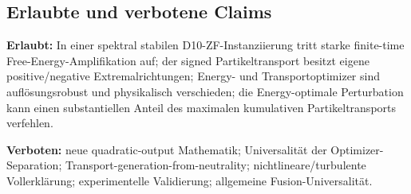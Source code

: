 \subsection{Erlaubte und verbotene Claims}
\textbf{Erlaubt:} In einer spektral stabilen D10-ZF-Instanziierung tritt starke finite-time Free-Energy-Amplifikation auf; der signed Partikeltransport besitzt eigene positive/negative Extremalrichtungen; Energy- und Transportoptimizer sind auflösungsrobust und physikalisch verschieden; die Energy-optimale Perturbation kann einen substantiellen Anteil des maximalen kumulativen Partikeltransports verfehlen.

\textbf{Verboten:} neue quadratic-output Mathematik; Universalität der Optimizer-Separation; Transport-generation-from-neutrality; nichtlineare/turbulente Vollerklärung; experimentelle Validierung; allgemeine Fusion-Universalität.
